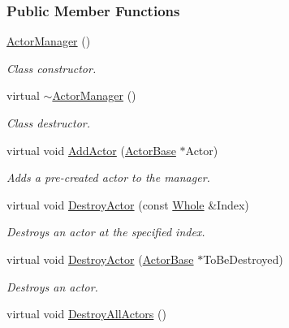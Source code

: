 \subsubsection*{Public Member Functions}
\begin{DoxyCompactItemize}
\item 
\hypertarget{classMezzanine_1_1ActorManager_aa9074e3c8dd87865e957c4d76fbc5e25}{
\hyperlink{classMezzanine_1_1ActorManager_aa9074e3c8dd87865e957c4d76fbc5e25}{ActorManager} ()}
\label{classMezzanine_1_1ActorManager_aa9074e3c8dd87865e957c4d76fbc5e25}

\begin{DoxyCompactList}\small\item\em Class constructor. \item\end{DoxyCompactList}\item 
\hypertarget{classMezzanine_1_1ActorManager_acb09f9f1b4766dd2ca9e645bb505ac2f}{
virtual \hyperlink{classMezzanine_1_1ActorManager_acb09f9f1b4766dd2ca9e645bb505ac2f}{$\sim$ActorManager} ()}
\label{classMezzanine_1_1ActorManager_acb09f9f1b4766dd2ca9e645bb505ac2f}

\begin{DoxyCompactList}\small\item\em Class destructor. \item\end{DoxyCompactList}\item 
virtual void \hyperlink{classMezzanine_1_1ActorManager_af801d07590853b3ae0c52574a340ea44}{AddActor} (\hyperlink{classMezzanine_1_1ActorBase}{ActorBase} $\ast$Actor)
\begin{DoxyCompactList}\small\item\em Adds a pre-\/created actor to the manager. \item\end{DoxyCompactList}\item 
virtual void \hyperlink{classMezzanine_1_1ActorManager_a5e4daba372199d0d140fd590a4d0f501}{DestroyActor} (const \hyperlink{namespaceMezzanine_adcbb6ce6d1eb4379d109e51171e2e493}{Whole} \&Index)
\begin{DoxyCompactList}\small\item\em Destroys an actor at the specified index. \item\end{DoxyCompactList}\item 
virtual void \hyperlink{classMezzanine_1_1ActorManager_a39d628c0ee0eaa225df741835f1061e7}{DestroyActor} (\hyperlink{classMezzanine_1_1ActorBase}{ActorBase} $\ast$ToBeDestroyed)
\begin{DoxyCompactList}\small\item\em Destroys an actor. \item\end{DoxyCompactList}\item 
\hypertarget{classMezzanine_1_1ActorManager_ac71886ad26a513d1b53f0e2d6049539c}{
virtual void \hyperlink{classMezzanine_1_1ActorManager_ac71886ad26a513d1b53f0e2d6049539c}{DestroyAllActors} ()}
\label{classMezzanine_1_1ActorManager_ac71886ad26a513d1b53f0e2d6049539c}


\end{DoxyCompactItemize}
